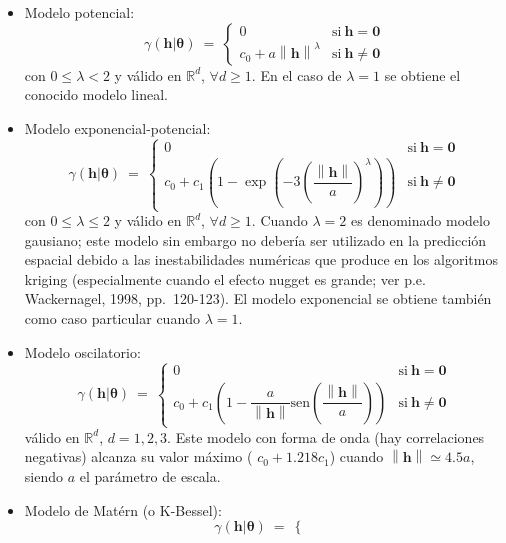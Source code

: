 \documentclass[
  spanish,
]{book}
\theoremstyle{break}
\begin{document}
\begin{itemize}
\[  \right.\]
  válido en \(\mathbb{R}^{d}\), \(\forall d \geq 1\).
\item
  Modelo potencial:
  \[\gamma(\mathbf{h}\left| \boldsymbol{\theta}\right. )\ =\ \left\{ 
  \begin{array}{ll}
  0 & \text{si}\  \mathbf{h}=\mathbf{0} \\
  c_{0} + a\left\| \mathbf{h}\right\|^{\lambda }  & \text{si}\ 
  \mathbf{h}\neq \mathbf{0}
  \end{array}
  \right.\]
  con \(0\leq \lambda <2\) y válido en \(\mathbb{R}^{d}\), \(\forall d \geq 1\).
  En el caso de \(\lambda =1\) se obtiene el conocido modelo lineal.
\item
  Modelo exponencial-potencial:
  \[\gamma(\mathbf{h}\left| \boldsymbol{\theta}\right. )\ =\ \left\{ 
  \begin{array}{ll}
  0 & \text{si}\  \mathbf{h}=\mathbf{0} \\
  c_{0} + c_1 \left( 1-\exp \left( -3\left( \dfrac{\left\|
  \mathbf{h}\right\| }{a} \right)^{\lambda } \right) \right)  & \text{si}\ 
  \mathbf{h}\neq \mathbf{0}
  \end{array}
  \right.\]
  con \(0\leq \lambda \leq 2\) y válido en \(\mathbb{R}^{d}\), \(\forall d \geq 1\).
  Cuando \(\lambda =2\) es denominado modelo gausiano;
  este modelo sin embargo no debería ser utilizado en la predicción
  espacial debido a las inestabilidades numéricas que produce en los
  algoritmos kriging (especialmente cuando el efecto nugget es grande; ver
  p.e. Wackernagel, 1998, pp.~120-123).
  El modelo exponencial se obtiene también como caso particular cuando \(\lambda =1\).
\item
  Modelo oscilatorio:
  \[\gamma(\mathbf{h}\left| \boldsymbol{\theta}\right. )\ =\ \left\{ 
  \begin{array}{ll}
  0 & \text{si}\  \mathbf{h}=\mathbf{0} \\
  c_{0} + c_1 \left( 1-\dfrac{a}{\left\| \mathbf{h}\right\| }
  \text{sen} \left( \dfrac{\left\| \mathbf{h}\right\| }{a} \right) \right) 
  & \text{si}\  \mathbf{h}\neq \mathbf{0}
  \end{array}
  \right.\]
  válido en \(\mathbb{R}^{d}\), \(d=1,2,3\).
  Este modelo con forma de onda (hay correlaciones negativas) alcanza su valor máximo ( \(c_{0} +1.218c_1\)) cuando \(\left\| \mathbf{h}\right\| \simeq 4.5a\), siendo \(a\) el parámetro de escala.
\item
  Modelo de Matérn (o K-Bessel):
  \[\gamma(\mathbf{h}\left| \boldsymbol{\theta}\right. )\ =\ \left\{ 
  \begin{array}{ll}

\end{array}\]
\end{itemize}
\end{document}
